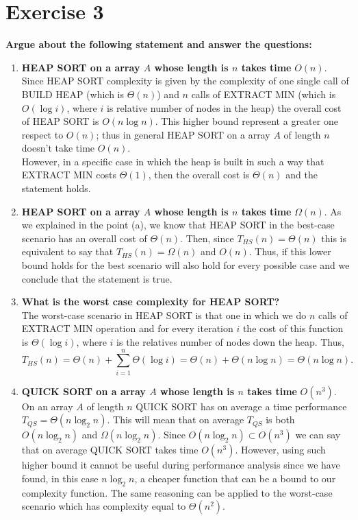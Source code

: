 \documentclass{article}
\begin{document}
	\section*{Exercise 3}
	\textbf{Argue about the following statement and answer the questions:}
	\begin{enumerate}[label=(\alph*)]
		\item \textbf{HEAP SORT on a array $A$ whose length is $n$ takes time} $O(n)$. 
		Since HEAP SORT complexity is given by the complexity of one single call of BUILD HEAP (which is $\Theta(n)$) and $n$ calls of EXTRACT MIN (which is $O(\log i)$, where $i$ is relative number of nodes in the heap) the overall cost of HEAP SORT is $O(n\log n)$. This higher bound represent a greater one respect to $O(n)$; thus in general HEAP SORT on a array $A$ of length $n$ doesn't take time $O(n)$. \\
		However, in a specific case in which the heap is built in such a way that EXTRACT MIN costs $\Theta(1)$, then the overall cost is $\Theta(n)$ and the statement holds.
		
		 
		\item \textbf{HEAP SORT on a array $A$ whose length is $n$ takes time} $\Omega(n)$. 
		As we explained in the point (a), we know that HEAP SORT in the best-case scenario has an overall cost of $\Theta(n)$. Then, since $T_{HS} (n) = \Theta(n)$ this is equivalent to say that  $T_{HS} (n) = \Omega(n)$ and $O(n)$. Thus, if this lower bound holds for the best scenario will also hold for every possible case and we conclude that the statement is true. 
		
		\item \textbf{What is the worst case complexity for HEAP SORT?}\\
		The worst-case scenario in HEAP SORT is that one in which we do $n$ calls of EXTRACT MIN operation and for every iteration $i$ the cost of this function is $\Theta(\log i)$, where $i$ is the relatives number of nodes down the heap. Thus,
		\begin{equation*}
		T_{HS} (n) = \Theta(n) + \sum_{i=1}^{n} \Theta(\log i) = \Theta(n) + \Theta(n\log n) = \Theta(n\log n).  
		\end{equation*}
		
		\item \textbf{QUICK SORT on a array $A$ whose length is $n$ takes time} $O(n^3)$. 
		On an array $A$ of length $n$ QUICK SORT has on average a time performance $T_{QS} = \Theta(n \log_2 n) $.  This will mean that on average $T_{QS}$ is both $O(n\log_2 n)$ and $\Omega(n\log_2 n)$. Since $O(n\log_2 n) \subset O(n^3)$ we can say that on  average QUICK SORT takes time $O(n^3)$. However, using such higher bound it cannot be useful during performance analysis since we have found, in this case $n\log_2 n$, a cheaper function that can be a bound to our complexity function. 
		The same reasoning can be applied to the worst-case scenario which has complexity equal to $\Theta(n^2) $.
		

\end{enumerate}
\end{document}
